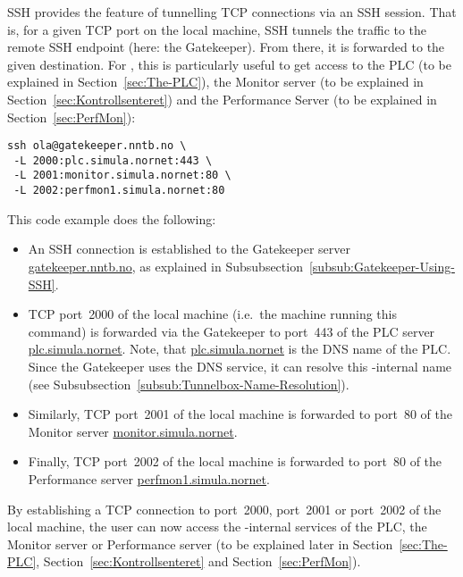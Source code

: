 SSH provides the feature of tunnelling TCP connections via an SSH session. That is, for a given TCP port on the local machine, SSH tunnels the traffic to the remote SSH endpoint (here: the Gatekeeper). From there, it is forwarded to the given destination.  For , this is particularly useful to get access to the PLC (to be explained in Section~\ref{sec:The-PLC}), the Monitor server (to be explained in Section~\ref{sec:Kontrollsenteret}) and the Performance Server (to be explained in Section~\ref{sec:PerfMon}):
\begin{lstlisting}
ssh ola@gatekeeper.nntb.no \
 -L 2000:plc.simula.nornet:443 \
 -L 2001:monitor.simula.nornet:80 \
 -L 2002:perfmon1.simula.nornet:80
\end{lstlisting}
This code example does the following:
\begin{itemize}
 \item An SSH connection is established to the Gatekeeper server \href{ssh://gatekeeper.nntb.no}{gatekeeper.nntb.no}, as explained in Subsubsection~\ref{subsub:Gatekeeper-Using-SSH}.
 
 \item TCP port~2000 of the local machine (i.e.\ the machine running this command) is forwarded via the Gatekeeper to port~443 of the PLC server \href{https://plc.simula.nornet}{plc.simula.nornet}. Note, that \href{https://plc.simula.nornet}{plc.simula.nornet} is the DNS name of the PLC. Since the Gatekeeper uses the  DNS service, it can resolve this -internal name (see Subsubsection~\ref{subsub:Tunnelbox-Name-Resolution}).
 
 \item Similarly, TCP port~2001 of the local machine is forwarded to port~80 of the Monitor server \href{http://monitor.simula.nornet}{monitor.simula.nornet}.

 \item Finally, TCP port~2002 of the local machine is forwarded to port~80 of the Performance server \href{http://perfmon1.simula.nornet}{perfmon1.simula.nornet}.
\end{itemize}
By establishing a TCP connection to port~2000, port~2001 or port~2002 of the local machine, the user can now access the -internal services of the PLC, the Monitor server or Performance server (to be explained later in Section~\ref{sec:The-PLC}, Section~\ref{sec:Kontrollsenteret} and Section~\ref{sec:PerfMon}).

